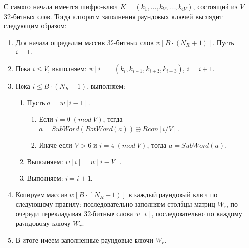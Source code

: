     С самого начала имеется шифро-ключ $K = (k_1, \dots, k_{V}, \dots, k_{4V})$, состоящий из $V$ 32-битных слов.
    Тогда алгоритм заполнения раундовых ключей выглядит следующим образом:
    \begin{enumerate}
        \item Для начала определим массив 32-битных слов $w[B \cdot (N_R + 1)]$. Пусть $i = 1$.
        \item Пока $i \leq V$, выполняем: $w[i] = (k_{i}, k_{i + 1}, k_{i + 2}, k_{i + 3})$, $i = i + 1$.
        \item Пока $i \leq B \cdot (N_R + 1)$, выполняем:
        \begin{enumerate}
            \item Пусть $a = w[i - 1]$.

            \begin{enumerate}
                \item Если $i = 0 \; (mod \; V)$, тогда $a = SubWord(RotWord(a)) \oplus Rcon[i / V]$.
                \item Иначе если $V > 6$ и $i = 4 \; (mod \; V)$, тогда $a = SubWord(a)$.
            \end{enumerate}

            \item Выполняем: $w[i] = w[i - V]$.
            \item Выполняем: $i = i + 1$.
        \end{enumerate}

        \item Копируем массив $w[B \cdot (N_R + 1)]$ в каждый раундовый ключ по следующему правилу: последовательно
        заполняем столбцы матриц $W_r$, по очереди перекладывая 32-битные слова $w[i]$, последовательно по каждому
        раундовому ключу $W_r$.
        \item В итоге имеем заполненные раундовые ключи $W_r$.
    \end{enumerate}


